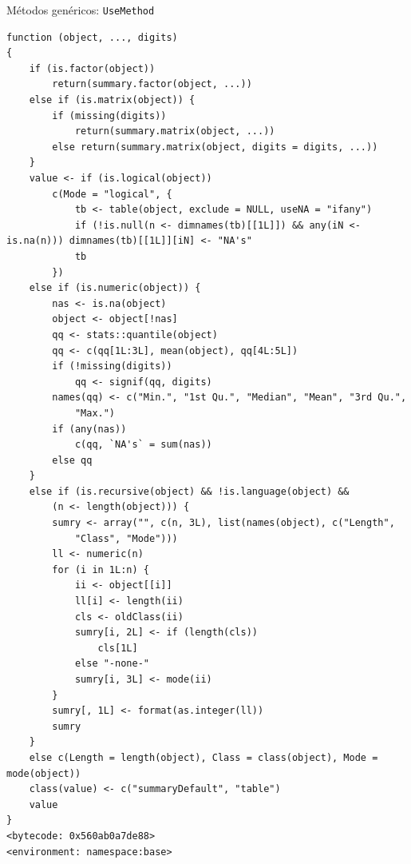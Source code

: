 \documentclass[xcolor={usenames,svgnames,dvipsnames}]{beamer}
\begin{document}
\begin{frame}[label={sec:org53500e3},fragile]{Métodos genéricos: \texttt{UseMethod}}
\begin{verbatim}
function (object, ..., digits) 
{
    if (is.factor(object)) 
        return(summary.factor(object, ...))
    else if (is.matrix(object)) {
        if (missing(digits)) 
            return(summary.matrix(object, ...))
        else return(summary.matrix(object, digits = digits, ...))
    }
    value <- if (is.logical(object)) 
        c(Mode = "logical", {
            tb <- table(object, exclude = NULL, useNA = "ifany")
            if (!is.null(n <- dimnames(tb)[[1L]]) && any(iN <- is.na(n))) dimnames(tb)[[1L]][iN] <- "NA's"
            tb
        })
    else if (is.numeric(object)) {
        nas <- is.na(object)
        object <- object[!nas]
        qq <- stats::quantile(object)
        qq <- c(qq[1L:3L], mean(object), qq[4L:5L])
        if (!missing(digits)) 
            qq <- signif(qq, digits)
        names(qq) <- c("Min.", "1st Qu.", "Median", "Mean", "3rd Qu.", 
            "Max.")
        if (any(nas)) 
            c(qq, `NA's` = sum(nas))
        else qq
    }
    else if (is.recursive(object) && !is.language(object) && 
        (n <- length(object))) {
        sumry <- array("", c(n, 3L), list(names(object), c("Length", 
            "Class", "Mode")))
        ll <- numeric(n)
        for (i in 1L:n) {
            ii <- object[[i]]
            ll[i] <- length(ii)
            cls <- oldClass(ii)
            sumry[i, 2L] <- if (length(cls)) 
                cls[1L]
            else "-none-"
            sumry[i, 3L] <- mode(ii)
        }
        sumry[, 1L] <- format(as.integer(ll))
        sumry
    }
    else c(Length = length(object), Class = class(object), Mode = mode(object))
    class(value) <- c("summaryDefault", "table")
    value
}
<bytecode: 0x560ab0a7de88>
<environment: namespace:base>
\end{verbatim}
\end{frame}
\end{document}
